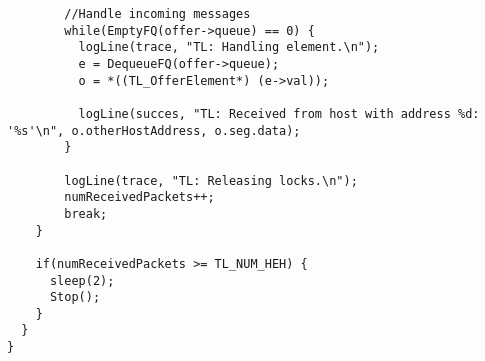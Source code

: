 \begin{lstlisting}
        //Handle incoming messages
        while(EmptyFQ(offer->queue) == 0) {
          logLine(trace, "TL: Handling element.\n");
          e = DequeueFQ(offer->queue);
          o = *((TL_OfferElement*) (e->val));

          logLine(succes, "TL: Received from host with address %d: '%s'\n", o.otherHostAddress, o.seg.data);
        }

        logLine(trace, "TL: Releasing locks.\n");
        numReceivedPackets++;
        break;
    }

    if(numReceivedPackets >= TL_NUM_HEH) {
      sleep(2);
      Stop();
    }
  }
}

\end{lstlisting}




\hfill \break

